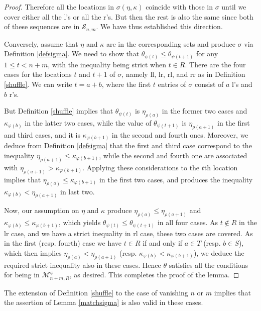 \documentclass{article}
\theoremstyle{definition}
\begin{document}
\begin{proof}
Therefore all the locations in $\sigma(\eta,\kappa)$ coincide with those in $\sigma$ until we cover either all the l's or all the r's. But then the rest is also the same since both of these sequences are in $\mathcal{S}_{n,m}$. We have thus established this direction.

Conversely, assume that $\eta$ and $\kappa$ are in the corresponding sets and produce $\sigma$ via Definition \ref{defsigma}. We need to show that $\theta_{\psi(t)}\leq\theta_{\psi(t+1)}$ for any $1 \leq t<n+m$, with the inequality being strict when $t \in R$. There are the four cases for the locations $t$ and $t+1$ of $\sigma$, namely ll, lr, rl, and rr as in Definition \ref{shuffle}. We can write $t=a+b$, where the first $t$ entries of $\sigma$ consist of $a$ l's and $b$ r's.

But Definition \ref{shuffle} implies that $\theta_{\psi(t)}$ is $\eta_{\rho(a)}$ in the former two cases and $\kappa_{\varphi(b)}$ in the latter two cases, while the value of $\theta_{\psi(t+1)}$ is $\eta_{\rho(a+1)}$ in the first and third cases, and it is $\kappa_{\varphi(b+1)}$ in the second and fourth ones. Moreover, we deduce from Definition \ref{defsigma} that the first and third case correspond to the inequality $\eta_{\rho(a+1)}\leq\kappa_{\varphi(b+1)}$, while the second and fourth one are associated with $\eta_{\rho(a+1)}>\kappa_{\varphi(b+1)}$. Applying these considerations to the $t$th location implies that $\eta_{\rho(a)}\leq\kappa_{\varphi(b+1)}$ in the first two cases, and produces the inequality $\kappa_{\varphi(b)}<\eta_{\rho(a+1)}$ in last two.

Now, our assumption on $\eta$ and $\kappa$ produce $\eta_{\rho(a)}\leq\eta_{\rho(a+1)}$ and $\kappa_{\varphi(b)}\leq\kappa_{\varphi(b+1)}$, which yields $\theta_{\psi(t)}\leq\theta_{\psi(t+1)}$ in all four cases. As $t \not\in R$ in the lr case, and we have a strict inequality in rl case, these two cases are covered. As in the first (resp. fourth) case we have $t \in R$ if and only if $a \in T$ (resp. $b \in S$), which then implies $\eta_{\rho(a)}<\eta_{\rho(a+1)}$ (resp. $\kappa_{\varphi(b)}<\kappa_{\varphi(b+1)}$), we deduce the required strict inequality also in these cases. Hence $\theta$ satisfies all the conditions for being in $\mathcal{M}_{n+m,R}^{\psi}$, as desired. This completes the proof of the lemma.
\end{proof}
The extension of Definition \ref{shuffle} to the case of vanishing $n$ or $m$ implies that the assertion of Lemma \ref{matchsigma} is also valid in these cases.
\end{document}
